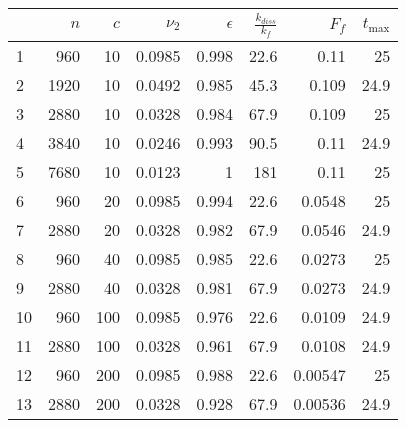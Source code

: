 \begin{tabular}{lrrrrrrr}
\toprule
{} &  $n$ &  $c$ &  $\nu_2$ &  $\epsilon$ &  $\frac{k_{diss}}{k_f}$ &   $F_f$ &  $t_{\max}$ \\
\midrule
1  &  960 &   10 &   0.0985 &       0.998 &                    22.6 &    0.11 &          25 \\
2  & 1920 &   10 &   0.0492 &       0.985 &                    45.3 &   0.109 &        24.9 \\
3  & 2880 &   10 &   0.0328 &       0.984 &                    67.9 &   0.109 &          25 \\
4  & 3840 &   10 &   0.0246 &       0.993 &                    90.5 &    0.11 &        24.9 \\
5  & 7680 &   10 &   0.0123 &           1 &                     181 &    0.11 &          25 \\
6  &  960 &   20 &   0.0985 &       0.994 &                    22.6 &  0.0548 &          25 \\
7  & 2880 &   20 &   0.0328 &       0.982 &                    67.9 &  0.0546 &        24.9 \\
8  &  960 &   40 &   0.0985 &       0.985 &                    22.6 &  0.0273 &          25 \\
9  & 2880 &   40 &   0.0328 &       0.981 &                    67.9 &  0.0273 &        24.9 \\
10 &  960 &  100 &   0.0985 &       0.976 &                    22.6 &  0.0109 &        24.9 \\
11 & 2880 &  100 &   0.0328 &       0.961 &                    67.9 &  0.0108 &        24.9 \\
12 &  960 &  200 &   0.0985 &       0.988 &                    22.6 & 0.00547 &          25 \\
13 & 2880 &  200 &   0.0328 &       0.928 &                    67.9 & 0.00536 &        24.9 \\
\bottomrule
\end{tabular}
